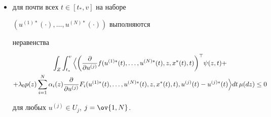\begin{thms}
\begin{itemize}
\item[2)] для почти всех $t\in[t_*,v]$ на наборе 


$(u^{(1)*}(\cdot),\dotsc,u^{(N)*}(\cdot))$ выполняются 


неравенства 


\begin{multline*} 


\int_Z\int^v_{t_*}\Big\la\bigg(\frac{\partial}{\partial u^{(j)}} 


f(u^{(1)*}(t),\dotsc,u^{(N)*}(t),z,x^*(t),t)\bigg)^\top 


\psi(z,t)+ \\ 


+\lambda_0p(z)\sum^N_{i=1}\alpha_i(z) 


\frac{\partial}{\partial u^{(j)}}F_i 


(u^{(1)*}(t),\dotsc,u^{(N)*}(t),z,x^*(t),t), 


u^{(j)}(t)-u^{(j)*}(t)\Big\ra dt\,\mu(dz)\le0 


\end{multline*} 


для любых $u^{(j)}\in U_j$, $j=\ov{1,N}$. 


\end{itemize} 


\end{thms} 


 


 


